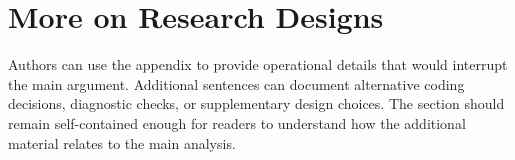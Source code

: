 \section{More on Research Designs}
\label{app:research-design}

Authors can use the appendix to provide operational details that would interrupt the main argument. Additional sentences can document alternative coding decisions, diagnostic checks, or supplementary design choices. The section should remain self-contained enough for readers to understand how the additional material relates to the main analysis.

